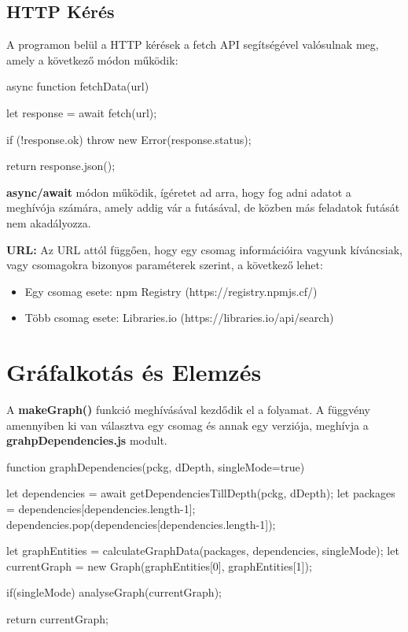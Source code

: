 \pagebreak

\subsection{HTTP Kérés}

A programon belül a HTTP kérések a fetch API segítségével valósulnak meg, amely a következő módon működik:

\begin{js}
async function fetchData(url){
	let response = await fetch(url);
	
	if (!response.ok) {
		throw new Error(response.status);
	}
	
	return response.json();
}
\end{js}

\textbf{async/await} módon működik, ígéretet ad arra, hogy fog adni adatot a meghívója számára, amely addig vár a futásával, de közben más feladatok futását nem akadályozza.

\textbf{URL:} Az URL attól függően, hogy egy csomag információira vagyunk kíváncsiak, vagy csomagokra bizonyos paraméterek szerint, a következő lehet:
\begin{itemize}
	\item Egy csomag esete: npm Registry (https://registry.npmjs.cf/)
	\item Több csomag esete: Libraries.io (https://libraries.io/api/search)
\end{itemize} 

\section{Gráfalkotás és Elemzés}

A \textbf{makeGraph()} funkció meghívásával kezdődik el a folyamat. A függvény amennyiben ki van választva egy csomag és annak egy verziója, meghívja a \textbf {grahpDependencies.js} modult. 

\begin{js}
function graphDependencies(pckg, dDepth, singleMode=true){
	
	let dependencies = await getDependenciesTillDepth(pckg, dDepth);
	let packages = dependencies[dependencies.length-1];
	dependencies.pop(dependencies[dependencies.length-1]);
	
	let graphEntities = 
		calculateGraphData(packages, dependencies, singleMode);
	let currentGraph = 
		new Graph(graphEntities[0], graphEntities[1]);
	
	if(singleMode){
		analyseGraph(currentGraph);
	}
	
	return currentGraph;
}	
\end{js}

